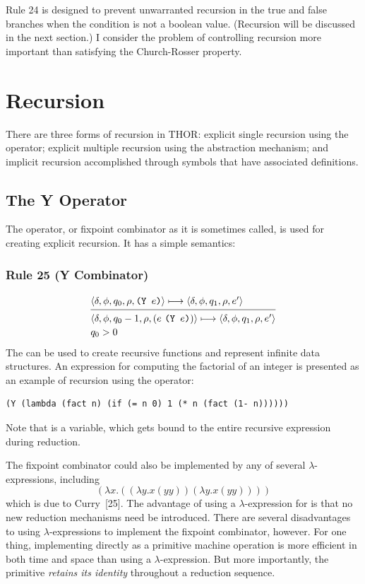 Rule 24 is designed to prevent unwarranted recursion in the true and false
branches when the condition is not a boolean value. (Recursion will be discussed
in the next section.) I consider the problem of
controlling recursion more important than satisfying the Church-Rosser property.

\section{Recursion}

There are three forms of recursion in THOR: explicit single recursion using the
 operator; explicit multiple recursion using the 
abstraction mechanism; and implicit recursion accomplished through symbols that
have associated definitions.

\subsection{The Y Operator}

The  operator, or fixpoint combinator as it is sometimes called, is used
for creating explicit recursion. It has a simple semantics:

\subsubsection*{Rule 25 (Y Combinator)}
\[
\semanticrule{
\cfg{\delta}{\phi}{q_0}{\rho}{\THOR{(Y }e\THOR{)}}\redsto
\cfg{\delta}{\phi}{q_1}{\rho}{e'}
}{
\cfg{\delta}{\phi}{q_0-1}{\rho}{(e\ \THOR{(Y }e\THOR{)})}\redsto
\cfg{\delta}{\phi}{q_1}{\rho}{e'}\\
q_0>0
}
\]
The  can be used to create recursive functions and represent infinite
data structures. An expression for computing the factorial of an integer is
presented as an example of recursion using the  operator:
\begin{verbatim}
(Y (lambda (fact n) (if (= n 0) 1 (* n (fact (1- n))))))
\end{verbatim}
Note that  is a variable, which gets bound to the entire recursive
expression during reduction.

The fixpoint combinator could also be implemented by any of several
\(\lambda\)-expressions, including
\[
(\lambda x.((\lambda y.x(yy))(\lambda y.x(yy))))
\]
which is due to Curry~[25]. The advantage of using a \(\lambda\)-expression for
 is that no new reduction mechanisms need be introduced. There are
several disadvantages to using \(\lambda\)-expressions to implement the fixpoint
combinator, however. For one thing, implementing  directly as a
primitive machine operation is more efficient in both time and space than using
a \(\lambda\)-expression. But more importantly, the  primitive \emph{retains its identity} throughout a reduction sequence.

